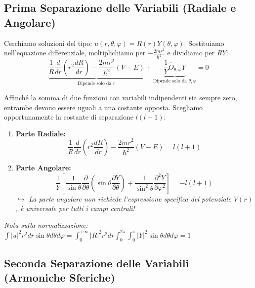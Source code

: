 \documentclass[11pt, a4paper]{article}
\begin{document}
\subsection{Prima Separazione delle Variabili (Radiale e Angolare)} %

Cerchiamo soluzioni del tipo: $u(r,\theta,\varphi) = R(r) Y(\theta,\varphi)$. %
Sostituiamo nell'equazione differenziale, moltiplichiamo per $-\frac{2mr^2}{\hbar^2}$ e dividiamo per $R Y$: %
\begin{equation*}
    \underbrace{ \frac{1}{R} \frac{d}{dr} \left( r^2 \frac{dR}{dr} \right) - \frac{2mr^2}{\hbar^2}(V - E) }_{\text{Dipende solo da } r} + \underbrace{ \frac{1}{Y} \hat{O}_{\theta,\varphi} Y }_{\text{Dipende solo da } \theta, \varphi} = 0 %
\end{equation*}

\noindent
Affinché la somma di due funzioni con variabili indipendenti sia sempre zero, entrambe devono essere uguali a una costante opposta. Scegliamo opportunamente la costante di separazione $l(l+1)$: %

\begin{enumerate}
    \item \textbf{Parte Radiale:} %
    \begin{equation}
        \frac{1}{R} \frac{d}{dr} \left( r^2 \frac{dR}{dr} \right) - \frac{2mr^2}{\hbar^2}(V - E) = l(l+1) %
    \end{equation}
    \item \textbf{Parte Angolare:} %
    \begin{equation}
        \frac{1}{Y} \left[ \frac{1}{\sin\theta} \frac{\partial}{\partial \theta} \left( \sin\theta \frac{\partial Y}{\partial \theta} \right) + \frac{1}{\sin^2\theta} \frac{\partial^2 Y}{\partial \varphi^2} \right] = -l(l+1) %
    \end{equation}
    $\hookrightarrow$ \textit{La parte angolare non richiede l'espressione specifica del potenziale $V(r)$, è universale per tutti i campi centrali!} %
\end{enumerate}

\textit{Nota sulla normalizzazione:} $\int |u|^2 r^2 dr \sin\theta d\theta d\varphi = \int_0^{+\infty} |R|^2 r^2 dr \int_0^{2\pi} \int_0^\pi |Y|^2 \sin\theta d\theta d\varphi = 1$ %

\subsection{Seconda Separazione delle Variabili (Armoniche Sferiche)} %
\end{document}
